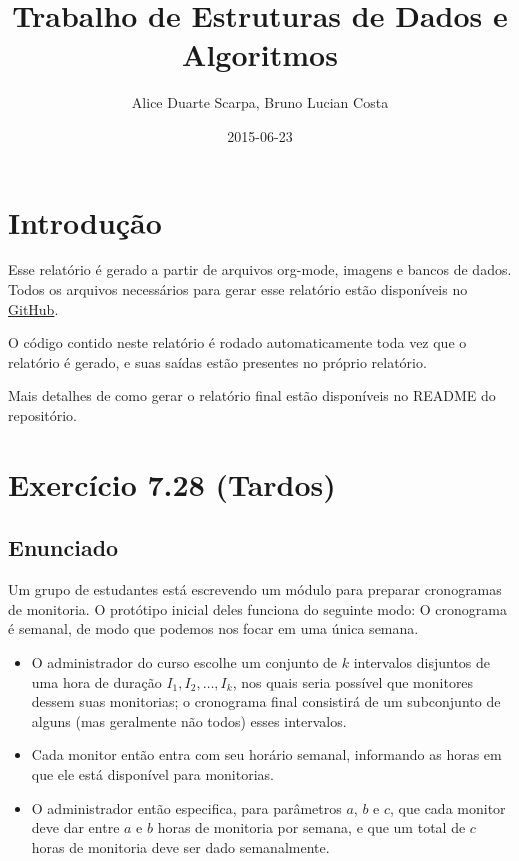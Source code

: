 \documentclass[11pt]{article}
\author{Alice Duarte Scarpa, Bruno Lucian Costa}
\date{2015-06-23}
\title{Trabalho de Estruturas de Dados e Algoritmos}
\begin{document}
\maketitle
\section{Introdução}
\label{sec-1}

Esse relatório é gerado a partir de arquivos org-mode, imagens e
bancos de dados. Todos os arquivos necessários para gerar esse
relatório estão disponíveis no \href{https://github.com/adusca/FGV-EDA}{GitHub}.

O código contido neste relatório é rodado automaticamente toda vez que
o relatório é gerado, e suas saídas estão presentes no próprio
relatório.

Mais detalhes de como gerar o relatório final estão disponíveis no
README do repositório.
\pagebreak

\section{Exercício 7.28 (Tardos)}
\label{sec-2}

\subsection{Enunciado}
\label{sec-2-1}

Um grupo de estudantes está escrevendo um módulo para preparar
cronogramas de monitoria. O protótipo inicial deles funciona do
seguinte modo: O cronograma é semanal, de modo que podemos nos focar
em uma única semana.

\begin{itemize}
\item O administrador do curso escolhe um conjunto de $k$
intervalos disjuntos de uma hora de duração $I_1, I_2, \ldots,
      I_k$, nos quais seria possível que monitores dessem suas
monitorias; o cronograma final consistirá de um subconjunto de
alguns (mas geralmente não todos) esses intervalos.
\item Cada monitor então entra com seu horário semanal, informando
as horas em que ele está disponível para monitorias.
\item O administrador então especifica, para parâmetros $a$, $b$ e
$c$, que cada monitor deve dar entre $a$ e $b$ horas de
monitoria por semana, e que um total de $c$ horas de monitoria
deve ser dado semanalmente.
\end{itemize}
\end{document}
